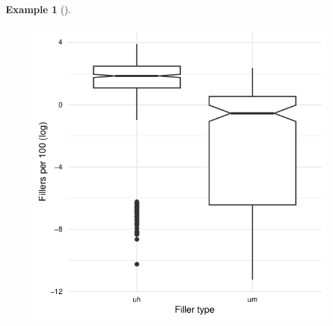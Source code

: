 \documentclass[
  letterpaper,
]{latex/krantz}
\theoremstyle{definition}
\newtheorem{example}{Example}[chapter]
\theoremstyle{remark}
\begin{document}
\begin{example}[]
\begin{figure}[H]
\begin{minipage}{0.50\linewidth}
{\includegraphics{part_4/10_infer_files/figure-pdf/fig-ida-multi-sex-plot-1.pdf}

}


\end{minipage}%
%
\begin{minipage}{0.50\linewidth}

\end{minipage}
\end{figure}
\end{example}
\end{document}
